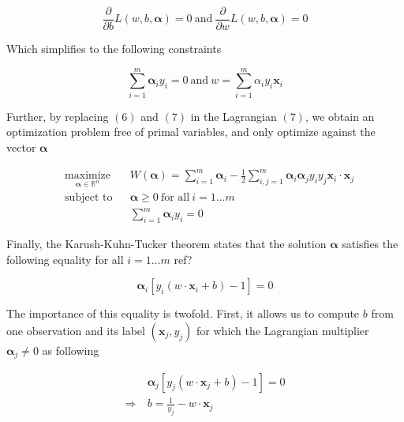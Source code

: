 \begin{equation}
  \frac{\partial}{\partial b}L(w, b, \boldsymbol{\alpha}) = 0
  \ \text{and}\ 
  \frac{\partial}{\partial w}L(w, b, \boldsymbol{\alpha}) = 0
\end{equation}

Which simplifies to the following constraints 

\begin{equation}
  \sum^m_{i=1} \boldsymbol{\alpha}_iy_i = 0
  \ \text{and}\ 
  w = \sum^m_{i=1} \alpha_iy_i\mathbf{x}_i
\end{equation}

Further, by replacing $(6)$ and $(7)$ in the Lagrangian $(7)$, we obtain an optimization problem free of primal variables, and only optimize against the vector $\boldsymbol{\alpha}$

\begin{equation}
  \begin{aligned}
    &\underset{\boldsymbol{\alpha} \in \mathbb{R}^n} {\text{maximize}}
    & & W(\boldsymbol{\alpha}) = \sum_{i=1}^m\boldsymbol{\alpha}_i - \frac{1}{2}\sum_{i,j=1}^m\boldsymbol{\alpha}_i\boldsymbol{\alpha}_jy_iy_j\mathbf{x}_i \cdot \mathbf{x}_j\\
    &\text{subject to}
    & &\boldsymbol{\alpha} \ge 0\ \text{for all}\ i = 1 \dotsc m\\
    & & &\sum^m_{i=1} \boldsymbol{\alpha}_iy_i = 0
  \end{aligned}
\end{equation}

Finally, the Karush-Kuhn-Tucker theorem states that the solution $\boldsymbol{\alpha}$ satisfies the following equality for all $i = 1\dotsc m$
\textcolor[rgb]{1,0,0}{ref?}

\begin{equation}
  \boldsymbol{\alpha}_i[y_i(w \cdot \mathbf{x}_i + b) - 1] = 0
\end{equation}

The importance of this equality is twofold. First, it allows us to compute $b$ from one observation and its label $(\mathbf{x}_j, y_j)$ for which the Lagrangian multiplier $\boldsymbol{\alpha}_j \neq 0$ as following

\begin{equation}
  \begin{aligned}
    &\boldsymbol{\alpha}_j[y_j(w \cdot \mathbf{x}_j + b) - 1] = 0\\
    \Rightarrow\ &b = \frac{1}{y_j} - w \cdot \mathbf{x}_j
  \end{aligned}
\end{equation}

